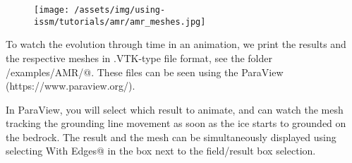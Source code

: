 \begin{figure}[H]
	\begin{center}
		\texttt{[image: /assets/img/using-issm/tutorials/amr/amr\_meshes.jpg]}
	\end{center}
\end{figure}

To watch the evolution through time in an animation, we print the results and the respective meshes in .VTK-type file format, see the folder \verb@trunk/examples/AMR/@. These files can be seen using the ParaView (https://www.paraview.org/).

In ParaView, you will select which result to animate, and can watch the mesh tracking the grounding line movement as soon as the ice starts to grounded on the bedrock. The result and the mesh can be simultaneously displayed using selecting \verb@Surface With Edges@ in the box next to the field/result box selection.
